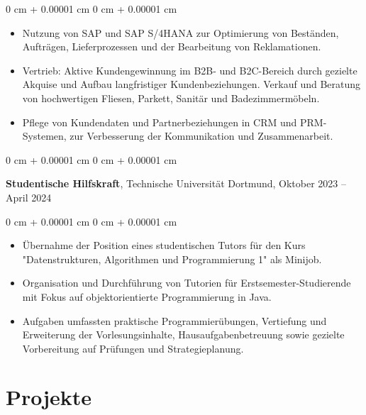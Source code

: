 \documentclass[10pt, letterpaper]{article}
\newenvironment{highlights}{
    \begin{itemize}[
        topsep=0.10 cm,
        parsep=0.10 cm,
        partopsep=0pt,
        itemsep=0pt,
        leftmargin=0 cm + 10pt
    ]
}{
    \end{itemize}
} %
\newenvironment{onecolentry}{
    \begin{adjustwidth}{
        0 cm + 0.00001 cm
    }{
        0 cm + 0.00001 cm
    }
}{
    \end{adjustwidth}
} %
\newenvironment{twocolentry}[2][]{
    \onecolentry
    \def\secondColumn{#2}
    \setcolumnwidth{\fill, 4.5 cm}
    \begin{paracol}{2}
}{
    \switchcolumn \raggedleft \secondColumn
    \end{paracol}
    \endonecolentry
} %
\begin{document}
        \vspace{0.10 cm}
        \begin{onecolentry}
            \begin{highlights}
                \item Nutzung von SAP und SAP S/4HANA zur Optimierung von Beständen, Aufträgen, Lieferprozessen und der Bearbeitung von Reklamationen.

               \item Vertrieb: Aktive Kundengewinnung im B2B- und B2C-Bereich durch gezielte Akquise und Aufbau langfristiger Kundenbeziehungen. Verkauf und Beratung von hochwertigen Fliesen, Parkett, Sanitär und Badezimmermöbeln.

                \item Pflege von Kundendaten und Partnerbeziehungen in CRM und PRM-Systemen, zur Verbesserung der Kommunikation und Zusammenarbeit.
            \end{highlights}
        \end{onecolentry}

        \vspace{1 cm}
 
        \begin{twocolentry}{
            Oktober 2023 – April 2024
        }
            \textbf{Studentische Hilfskraft}, Technische Universität Dortmund, \end{twocolentry}

       \vspace{0.10 cm}
\begin{onecolentry}
    \begin{highlights}
        \item Übernahme der Position eines studentischen Tutors für den Kurs "Datenstrukturen, Algorithmen und Programmierung 1" als Minijob.
        \item Organisation und Durchführung von Tutorien für Erstsemester-Studierende mit Fokus auf objektorientierte Programmierung in Java.
        \item Aufgaben umfassten praktische Programmierübungen, Vertiefung und Erweiterung der Vorlesungsinhalte, Hausaufgabenbetreuung sowie gezielte Vorbereitung auf Prüfungen und Strategieplanung.
    \end{highlights}
\end{onecolentry}
    
\section{Projekte}
\end{document}
